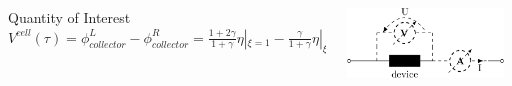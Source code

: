 \documentclass[8pt]{beamer}
\begin{document}
\begin{frame}
\begin{columns}
\begin{column}{.65\textwidth}
\begin{alertblock}{Quantity of Interest}
 $V^{cell}(\tau) = \phi_{collector}^L - \phi_{collector}^R
= \frac{1+2\gamma}{1+\gamma}\eta|_{\xi=1} - \frac{\gamma}{1+\gamma}\eta|_{\xi=0} - \frac{\gamma}{(1+\gamma)^2}I
 $
\end{alertblock} 
\end{column}
\begin{column}{.3\textwidth} 
    \includegraphics[trim = 0in 0in 0.in 0.2in, clip, width=0.95\textwidth]{figs_report/device.png}
\end{column}
\end{columns}



\vfill
\end{frame}
\end{document}

